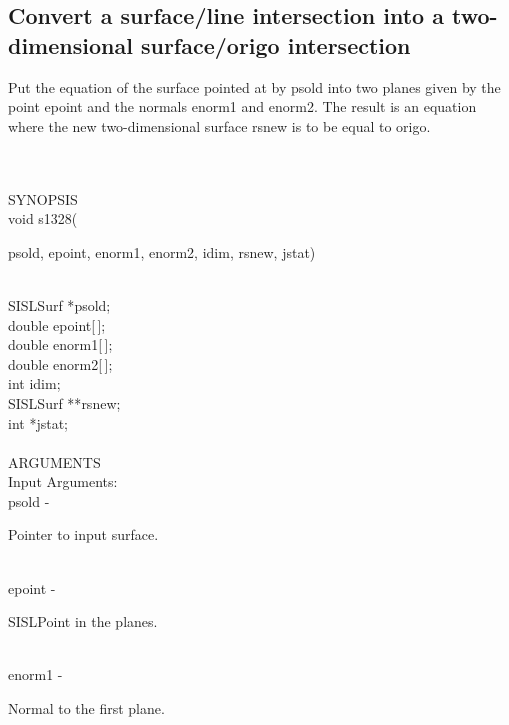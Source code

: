 \subsection{Convert a surface/line intersection into a two-dimensional surface/origo intersection}
\begin{minipg1}
Put the equation of the surface pointed at by psold
               into two planes given by the point epoint and the normals
               enorm1 and enorm2. The result is an equation where the 
               new two-dimensional surface rsnew is to be equal to origo.
\end{minipg1} \\ \\
SYNOPSIS\\
        \> void s1328(\begin{minipg3}
            {\fov psold}, {\fov epoint}, {\fov enorm1}, {\fov enorm2}, {\fov idim}, {\fov rsnew}, {\fov jstat})
                \end{minipg3}\\
                \>\>    SISLSurf    \>  *{\fov psold};\\
                \>\>    double \> epoint[\,];\\
                \>\>    double \> enorm1[\,];\\
                \>\>    double \> enorm2[\,];\\
                \>\>    int    \>  {\fov idim};\\
                \>\>    SISLSurf    \>  **{\fov rsnew};\\
                \>\>    int    \>  *{\fov jstat};\\
\\
ARGUMENTS\\
	\>Input Arguments:\\
        \>\>    {\fov psold}\> - \>  \begin{minipg2}
                     Pointer to input surface.
                               \end{minipg2}\\
        \>\>    {\fov epoint}\> - \>  \begin{minipg2}
                     SISLPoint in the planes.
                               \end{minipg2}\\
        \>\>    {\fov enorm1}\> - \>  \begin{minipg2}
                     Normal to the first plane.
                               \end{minipg2}\\
